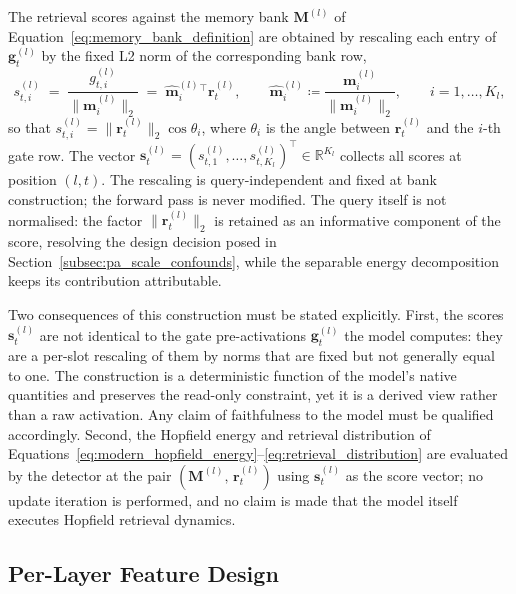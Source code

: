 The retrieval scores against the memory bank $\mathbf{M}^{(l)}$ of
Equation~\eqref{eq:memory_bank_definition} are obtained by rescaling each entry of
$\mathbf{g}_t^{(l)}$ by the fixed L2 norm of the corresponding bank row,
\begin{equation}
    s_{t,i}^{(l)}
    \;=\;
    \frac{g_{t,i}^{(l)}}{\|\mathbf{m}_i^{(l)}\|_2}
    \;=\;
    {\hat{\mathbf{m}}_i^{(l)}}{}^{\!\top}\mathbf{r}_t^{(l)},
    \qquad
    \hat{\mathbf{m}}_i^{(l)} \coloneqq
    \frac{\mathbf{m}_i^{(l)}}{\|\mathbf{m}_i^{(l)}\|_2},
    \qquad i = 1, \ldots, K_l,
    \label{eq:retrieval_scores}
\end{equation}
so that $s_{t,i}^{(l)} = \|\mathbf{r}_t^{(l)}\|_2\cos\theta_i$, where
$\theta_i$ is the angle between $\mathbf{r}_t^{(l)}$ and the $i$-th gate
row. The vector $\mathbf{s}_t^{(l)} = (s_{t,1}^{(l)}, \ldots,
s_{t,K_l}^{(l)})^\top \in \mathbb{R}^{K_l}$ collects all scores at
position $(l,t)$. The rescaling is query-independent and fixed at bank
construction; the forward pass is never modified. The query itself is not
normalised: the factor $\|\mathbf{r}_t^{(l)}\|_2$ is retained as an
informative component of the score, resolving the design decision posed in
Section~\ref{subsec:pa_scale_confounds}, while the separable energy
decomposition keeps its contribution attributable.

Two consequences of this construction must be stated explicitly. First, the
scores $\mathbf{s}_t^{(l)}$ are not identical to the gate pre-activations
$\mathbf{g}_t^{(l)}$ the model computes: they are a per-slot rescaling of
them by norms that are fixed but not generally equal to one. The
construction is a deterministic function of the model's native quantities
and preserves the read-only constraint, yet it is a derived view rather than
a raw activation. Any claim of faithfulness to the model must be qualified
accordingly. Second, the Hopfield energy and retrieval distribution of
Equations~\eqref{eq:modern_hopfield_energy}--\eqref{eq:retrieval_distribution}
are evaluated by the detector at the pair
$(\mathbf{M}^{(l)},\,\mathbf{r}_t^{(l)})$ using $\mathbf{s}_t^{(l)}$ as
the score vector; no update iteration is performed, and no claim is made
that the model itself executes Hopfield retrieval dynamics.
\subsection{Per-Layer Feature Design}
\label{subsec:feature_design}

